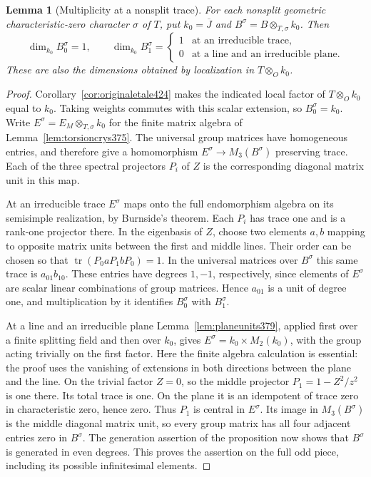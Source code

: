 \documentclass[a4paper,11pt]{article}
\newtheorem{lemma}[proposition]{Lemma}
\theoremstyle{definition}
\theoremstyle{remark}
\numberwithin{equation}{section}
\begin{document}
\begin{lemma}[Multiplicity at a nonsplit trace]\leavevmode
\label{lem:markmultiplicity425}
For each nonsplit geometric characteristic-zero character
\(\sigma\) of \(T\), put \(k_0=\overline J\) and
\(B^\sigma=B\otimes_{T,\sigma}k_0\). Then
\[
  \dim_{k_0} B^\sigma_0=1,\qquad
  \dim_{k_0} B^\sigma_1=
      \begin{cases}1&\text{at an irreducible trace},\\
                    0&\text{at a line and an irreducible plane}.
      \end{cases}
\]
These are also the dimensions obtained by localization in
\(T\otimes_O k_0\).
\end{lemma}
\begin{proof}
Corollary~\ref{cor:originaletale424} makes the indicated local
factor of \(T\otimes_O k_0\) equal to \(k_0\). Taking weights
commutes with this scalar extension, so \(B^\sigma_0=k_0\).
Write \(E^\sigma=E_M\otimes_{T,\sigma}k_0\) for the finite
matrix algebra of Lemma~\ref{lem:torsioncrys375}. The universal
group matrices have homogeneous entries, and therefore give
a homomorphism \(E^\sigma\to M_3(B^\sigma)\) preserving
trace. Each of the three spectral projectors \(P_i\) of \(Z\)
is the corresponding diagonal matrix unit in this map.

At an irreducible trace \(E^\sigma\) maps onto the full
endomorphism algebra on its semisimple realization, by
Burnside's theorem. Each \(P_i\) has trace one and is a
rank-one projector there. In the eigenbasis of \(Z\), choose
two elements \(a,b\) mapping to opposite matrix units between
the first and middle lines. Their order can be chosen so that
\(\operatorname{tr}(P_0aP_1bP_0)=1\). In the universal matrices
over \(B^\sigma\) this same trace is \(a_{01}b_{10}\). These
entries have degrees \(1,-1\), respectively, since elements
of \(E^\sigma\) are scalar linear combinations of group matrices.
Hence \(a_{01}\) is a unit of degree one, and multiplication
by it identifies \(B^\sigma_0\) with \(B^\sigma_1\).

At a line and an irreducible plane
Lemma~\ref{lem:planeunits379}, applied first over a finite
splitting field and then over \(k_0\), gives
\(E^\sigma=k_0\times M_2(k_0)\), with the group acting trivially
on the first factor. Here the finite algebra calculation is
essential: the proof uses the vanishing of extensions in both
directions between the plane and the line. On the trivial
factor \(Z=0\), so the middle projector \(P_1=1-Z^2/z^2\)
is one there. Its total trace is one. On the plane it is an
idempotent of trace zero in characteristic zero, hence zero.
Thus \(P_1\) is central in \(E^\sigma\). Its image in
\(M_3(B^\sigma)\) is the middle diagonal matrix unit, so
every group matrix has all four adjacent entries zero in
\(B^\sigma\). The generation assertion of the proposition now
shows that \(B^\sigma\) is generated in even degrees. This
proves the assertion on the full odd piece, including its
possible infinitesimal elements.
\end{proof}
\end{document}
